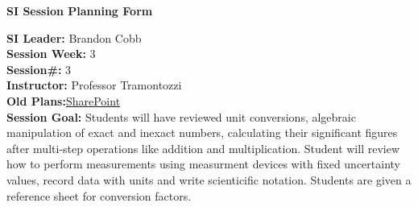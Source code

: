 \documentclass{article}
\begin{document}
\begin{center}
    {\LARGE\textbf{SI Session Planning Form}}
\end{center}

\vspace{0.5cm}

\noindent
\begin{flushleft}
\textbf{SI Leader:} Brandon Cobb\\
\textbf{Session Week:} 3\\
\textbf{Session\#:} 3\\
\textbf{Instructor:} Professor Tramontozzi\\
\textbf{Old Plans:}\href{https://macombedu.sharepoint.com/:b:/s/ASC-SupplementalInstructionEmbeddedTutoring/EeSYqCwT_KhMolgJvXbVEjgBOyF_DevvS8BgCm1zPkQQJg?e=QJTt4o}{SharePoint}\\
\textbf{Session Goal:} Students will have reviewed unit conversions, algebraic manipulation of exact and inexact numbers, calculating their significant figures after multi-step operations like addition and multiplication. Student will review how to perform measurements using measurment devices with fixed uncertainty values, record data with units and write scienticific notation. Students are given a reference sheet for conversion factors.
\end{flushleft}

\vspace{1em}
\end{document}
